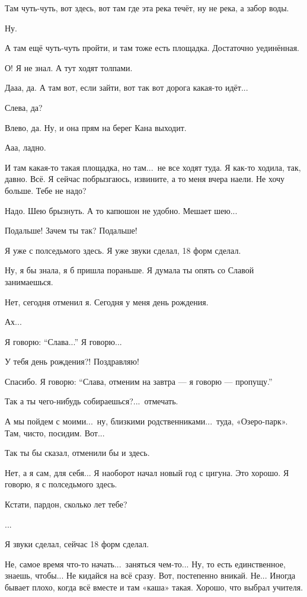 \M
Там чуть-чуть, вот здесь, вот там где эта река течёт, ну не река, а забор воды.

\I
Ну.

\M
А там ещё чуть-чуть пройти, и там тоже есть площадка.
Достаточно уединённая.

\I
О\null! Я не знал.
А тут ходят толпами.

\M
Дааа, да.
А там вот, если зайти, вот так вот
дорога какая-то идёт...

\I
Слева, да?

\M
Влево, да.
Ну, и она прям на берег Кана выходит.

\I
Ааа, ладно.

\M
И там какая-то такая площадка, но там...\ не все ходят туда.
Я как-то ходила, так, давно.
Всё. Я сейчас побрызгаюсь, извините, а то меня вчера наели.
Не хочу больше. Тебе не надо?

\I
Надо. Шею брызнуть. А то капюшон не удобно.
Мешает шею...

\M
Подальше! Зачем ты так? Подальше!

\I
Я уже с полседьмого здесь. Я уже
звуки сделал, 18 форм сделал.

\M
Ну, я бы знала, я б пришла пораньше.
Я думала ты опять со Славой занимаешься.

\I
Нет, сегодня отменил я. Сегодня у меня день рождения.

\M
Ах...

\I
Я говорю: ``Слава...'' Я говорю...

\M
У тебя день рождения?! Поздравляю!

\I
Спасибо.
Я говорю: ``Слава, отменим на завтра --- я говорю --- пропущу.''

\M
Так а ты чего-нибудь собираешься?...\ отмечать.

\I
А мы пойдем с моими...\ ну, близкими родственниками...\ туда, «Озеро-парк».
Там, чисто, посидим. Вот...

\M
Так ты бы сказал, отменили бы и здесь.

\I
Нет, а я сам, для себя...
Я наоборот начал новый год с цигуна. Это хорошо.
Я говорю, я с полседьмого здесь.

\M
Кстати, пардон, сколько лет тебе?


...

\I
Я звуки сделал, сейчас 18 форм сделал.

\M
Не, самое время что-то начать...\ заняться чем-то...
Ну, то есть единственное, знаешь, чтобы... Не кидайся на всё сразу.
Вот, постепенно вникай. Не... Иногда
бывает плохо, когда всё вместе и там «каша» такая. Хорошо, что выбрал учителя.


